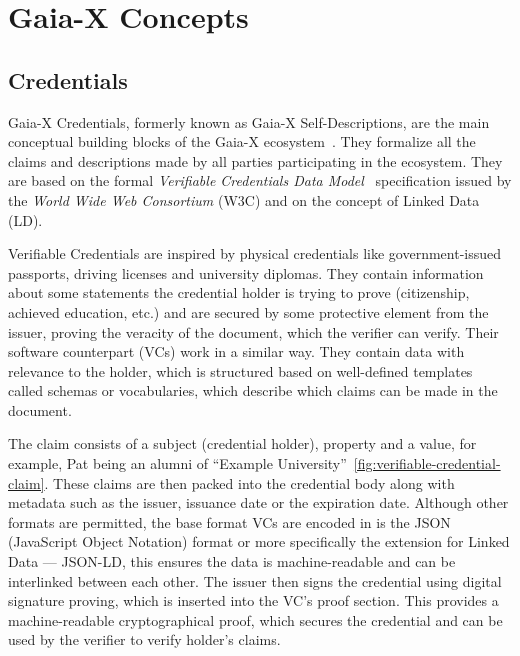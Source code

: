 \section{Gaia-X Concepts}\label{sec:gaia-x-concepts}

\subsection{Credentials}\label{subsec:credentials}

Gaia-X Credentials, formerly known as Gaia-X Self-Descriptions, are the main conceptual building blocks of the Gaia-X ecosystem~\cite{gaiax_architecture_document}.
They formalize all the claims and descriptions made by all parties participating in the ecosystem.
They are based on the formal \textit{Verifiable Credentials Data Model}~\cite{verifiable_credentials} specification issued by the \textit{World Wide Web Consortium} (W3C) and on the concept of Linked Data (LD).

Verifiable Credentials are inspired by physical credentials like government-issued passports, driving licenses and university diplomas.
They contain information about some statements the credential holder is trying to prove (citizenship, achieved education, etc.) and are secured by some protective element from the issuer, proving the veracity of the document, which the verifier can verify.
Their software counterpart (VCs) work in a similar way.
They contain data with relevance to the holder, which is structured based on well-defined templates called schemas or vocabularies, which describe which claims can be made in the document.

The claim consists of a subject (credential holder), property and a value, for example, Pat being an alumni of ``Example University''~\ref{fig:verifiable-credential-claim}.
These claims are then packed into the credential body along with metadata such as the issuer, issuance date or the expiration date.
Although other formats are permitted, the base format VCs are encoded in is the JSON (JavaScript Object Notation) format or more specifically the extension for Linked Data --- JSON-LD, this ensures the data is machine-readable and can be interlinked between each other.
The issuer then signs the credential using digital signature proving, which is inserted into the VC's proof section.
This provides a machine-readable cryptographical proof, which secures the credential and can be used by the verifier to verify holder's claims.

